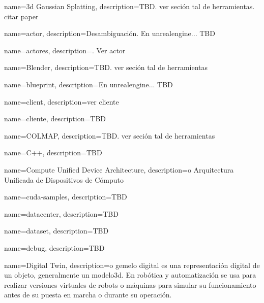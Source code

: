 


{
    name={\acrshort{3d} Gaussian Splatting},
    description={TBD. ver seción tal de herramientas. citar paper}
}


{
    name={actor},
    description={Desambiguación. En \gls{unrealengine}... TBD}
}

{
    name={actores},
    description={. Ver \gls{actor}}
}


{
    name={Blender},
    description={TBD. ver seción tal de herramientas}
}

{
    name={blueprint},
    description={En \gls{unrealengine}... TBD}
}


{
    name={client},
    description={ver \gls{cliente}}
}

{
    name={cliente},
    description={TBD}
}

{
    name={COLMAP},
    description={TBD. ver seción tal de herramientas}
}

{
    name={C++},
    description={TBD}
}

{
    name={Compute Unified Device Architecture},
    description={o Arquitectura Unificada de Dispositivos de Cómputo}
}

{
    name={cuda-samples},
    description={TBD}
}


{
    name={datacenter},
    description={TBD}
}

{
    name={dataset},
    description={TBD}
}

{
    name={debug},
    description={TBD}
}

{
    name={Digital Twin},
    description={o gemelo digital es una representación digital de un objeto, generalmente un \gls{modelo3d}. En robótica y automatización se usa para realizar versiones virtuales de robots o máquinas para simular su funcionamiento antes de su puesta en marcha o durante su operación.}
}


